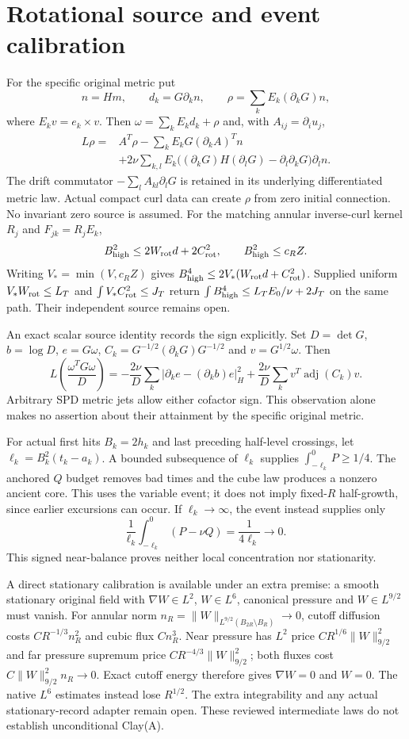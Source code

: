 \documentclass[11pt]{article}
\begin{document}
\section{Rotational source and event calibration}

For the specific original metric put
\[
 n=Hm,\qquad d_k=G\partial_kn,\qquad
 \rho=\sum_k E_k(\partial_kG)n,
\]
where $E_kv=e_k\times v$. Then
$\omega=\sum_kE_kd_k+\rho$ and, with $A_{ij}=\partial_i u_j$,
\[
 \begin{aligned}
 L\rho={}&A^T\rho-\sum_kE_kG(\partial_kA)^Tn\\
 &+2\nu\sum_{k,l}E_k\big((\partial_kG)H(\partial_lG)
                         -\partial_l\partial_kG\big)\partial_ln.
 \end{aligned}
\]
The drift commutator $-\sum_l A_{kl}\partial_lG$ is retained in its
underlying differentiated metric law. Actual compact curl data can create
$\rho$ from zero initial connection. No invariant zero source is assumed.
For the matching annular inverse-curl kernel $R_j$ and $F_{jk}=R_jE_k$,
\[
 B_{\rm high}^2\le2W_{\rm rot}d+2C_{\rm rot}^2,
 \qquad B_{\rm high}^2\le c_R Z.
\]
Writing $V_* =\min(V,c_RZ)$ gives
$B_{\rm high}^4\le2V_*(W_{\rm rot}d+C_{\rm rot}^2)$.
Supplied uniform $V_*W_{\rm rot}\le L_T$ and
$\int V_*C_{\rm rot}^2\le J_T$ return
$\int B_{\rm high}^4\le L_TE_0/\nu+2J_T$ on the same path.
Their independent source remains open.

An exact scalar source identity records the sign explicitly. Set
$D=\det G$, $b=\log D$, $e=G\omega$,
$C_k=G^{-1/2}(\partial_kG)G^{-1/2}$ and $v=G^{1/2}\omega$. Then
\[
 L\left(\frac{\omega^TG\omega}{D}\right)
 =-\frac{2\nu}{D}\sum_k|\partial_ke-(\partial_kb)e|_H^2
   +\frac{2\nu}{D}\sum_kv^T\operatorname{adj}(C_k)v.
\]
Arbitrary SPD metric jets allow either cofactor sign. This observation alone
makes no assertion about their attainment by the specific original metric.

For actual first hits $B_k=2h_k$ and last preceding half-level crossings,
let $\ell_k=B_k^2(t_k-a_k)$. A bounded subsequence of $\ell_k$ supplies
$\int_{-\ell_k}^0P\ge1/4$. The anchored $Q$ budget removes bad times and
the cube law produces a nonzero ancient core. This uses the variable event;
it does not imply fixed-$R$ half-growth, since earlier excursions can occur.
If $\ell_k\to\infty$, the event instead supplies only
\[
 \frac1{\ell_k}\int_{-\ell_k}^0(P-\nu Q)=\frac1{4\ell_k}\to0.
\]
This signed near-balance proves neither local concentration nor stationarity.

A direct stationary calibration is available under an extra premise:
a smooth stationary original field with $\nabla W\in L^2$, $W\in L^6$,
canonical pressure and $W\in L^{9/2}$ must vanish. For annular norm
$n_R=\|W\|_{L^{9/2}(B_{2R}\setminus B_R)}\to0$, cutoff diffusion costs
$CR^{-1/3}n_R^2$ and cubic flux $Cn_R^3$. Near pressure has $L^2$ price
$CR^{1/6}\|W\|_{9/2}^2$ and far pressure supremum price
$CR^{-4/3}\|W\|_{9/2}^2$; both fluxes cost
$C\|W\|_{9/2}^2n_R\to0$. Exact cutoff energy therefore gives
$\nabla W=0$ and $W=0$. The native $L^6$ estimates instead lose $R^{1/2}$.
The extra integrability and any actual stationary-record adapter remain
open. These reviewed intermediate laws do not establish unconditional Clay(A).
\end{document}
